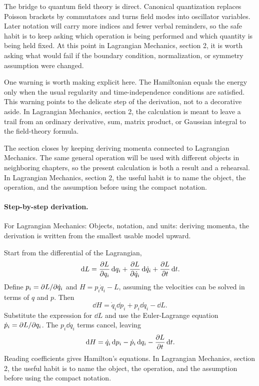 The bridge to quantum field theory is direct.  Canonical quantization replaces Poisson brackets by commutators and turns field modes into oscillator variables.  Later notation will carry more indices and fewer verbal reminders, so the safe habit is to keep asking which operation is being performed and which quantity is being held fixed.  At this point in Lagrangian Mechanics, section 2, it is worth asking what would fail if the boundary condition, normalization, or symmetry assumption were changed.

One warning is worth making explicit here.  The Hamiltonian equals the energy only when the usual regularity and time-independence conditions are satisfied.  This warning points to the delicate step of the derivation, not to a decorative aside.  In Lagrangian Mechanics, section 2, the calculation is meant to leave a trail from an ordinary derivative, sum, matrix product, or Gaussian integral to the field-theory formula.

The section closes by keeping deriving momenta connected to Lagrangian Mechanics.  The same general operation will be used with different objects in neighboring chapters, so the present calculation is both a result and a rehearsal.  In Lagrangian Mechanics, section 2, the useful habit is to name the object, the operation, and the assumption before using the compact notation.



\paragraph{Step-by-step derivation.}

For Lagrangian Mechanics: Objects, notation, and units: deriving momenta, the derivation is written from the smallest usable model upward.

Start from the differential of the Lagrangian,
\[
  \,\mathrm d L=\frac{\partial L}{\partial q_i}\,\mathrm d q_i+\frac{\partial L}{\partial\dot q_i}\,\mathrm d\dot q_i+\frac{\partial L}{\partial t}\,\mathrm d t.
\]
Define \(p_i=\partial L/\partial\dot q_i\) and \(H=p_i\dot q_i-L\), assuming the velocities can be solved in terms of \(q\) and \(p\).  Then
\[
  \dd H=\dot q_i\dd p_i+p_i\dd\dot q_i-\dd L.
\]
Substitute the expression for \(\dd L\) and use the Euler-Lagrange equation \(\dot p_i=\partial L/\partial q_i\).  The \(p_i\dd\dot q_i\) terms cancel, leaving
\[
  \,\mathrm d H=\dot q_i\,\mathrm d p_i-\dot p_i\,\mathrm d q_i-\frac{\partial L}{\partial t}\,\mathrm d t.
\]
Reading coefficients gives Hamilton's equations.  In Lagrangian Mechanics, section 2, the useful habit is to name the object, the operation, and the assumption before using the compact notation.


